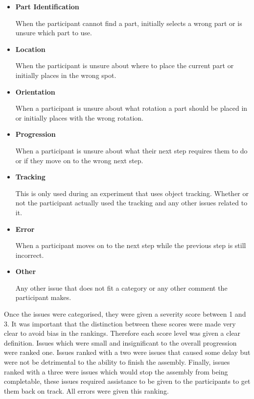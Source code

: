 \documentclass{l4proj}
\begin{document}
\begin{itemize}
    \item \textbf{Part Identification}
    
    When the participant cannot find a part, initially selects a wrong part or is unsure which part to use. 
    
    \item \textbf{Location}
    
    When the participant is unsure about where to place the current part or initially places in the wrong spot.
    
    \item \textbf{Orientation}
    
    When a participant is unsure about what rotation a part should be placed in or initially places with the wrong rotation.
    
    \item \textbf{Progression}
    
    When a participant is unsure about what their next step requires them to do or if they move on to the wrong next step.

    \item \textbf{Tracking}

    This is only used during an experiment that uses object tracking. Whether or not the participant actually used the tracking and any other issues related to it.
    
    \item \textbf{Error}
    
    When a participant moves on to the next step while the previous step is still incorrect.
    
    \item \textbf{Other}
    
    Any other issue that does not fit a category or any other comment the participant makes.
    
\end{itemize}

Once the issues were categorised, they were given a severity score between 1 and 3. It was important that the distinction between these scores were made very clear to avoid bias in the rankings. Therefore each score level was given a clear definition. Issues which were small and insignificant to the overall progression were ranked one. Issues ranked with a two were issues that caused some delay but were not be detrimental to the ability to finish the assembly. Finally, issues ranked with a three were issues which would stop the assembly from being completable, these issues required assistance to be given to the participants to get them back on track. All errors were given this ranking.
\end{document}
